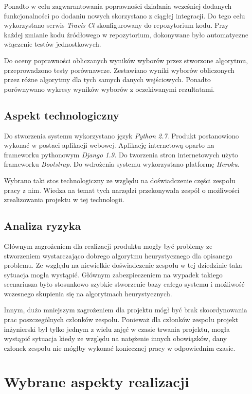 \documentclass[polish,11pt]{aghthesis}
\begin{document}
Ponadto w celu zagwarantowania poprawności działania wcześniej dodanych
funkcjonalności po dodaniu nowych skorzystano z ciągłej integracji. Do tego celu
wykorzystano serwis \textit{Travis Cl} skonfigurowany do repozytorium kodu. Przy każdej zmianie kodu źródłowego w repozytorium, dokonywane było automatyczne włączenie testów
jednostkowych.  

Do oceny poprawności obliczanych wyników wyborów przez stworzone algorytmu,
przeprowadzono testy porównawcze. Zestawiano wyniki wyborów obliczonych przez różne
algorytmy dla tych samych danych wejściowych. Ponadto porównywano wykresy wyników
wyborów z oczekiwanymi rezultatami.
\clearpage

\subsection{Aspekt technologiczny}
Do stworzenia systemu wykorzystano język \textit{Python 2.7}. Produkt postanowiono wykonać w
postaci aplikacji webowej. Aplikację internetową oparto na frameworku pythonowym \textit{Django 1.9.} Do tworzenia stron internetowych użyto frameworku \textit{Bootstrap}. Do wdrożenia systemu wykorzystano platformę \textit{Heroku}.

Wybrano taki stos technologiczny ze względu na doświadczenie części zespołu pracy z nim.
Wiedza na temat tych narzędzi przekonywała zespół o możliwości zrealizowania projektu w
tej technologii.

\subsection{Analiza ryzyka}
Głównym zagrożeniem dla realizacji produktu mogły być problemy ze stworzeniem
wystarczająco dobrego algorytmu heurystycznego dla opisanego problemu. Ze względu na
niewielkie doświadczenie zespołu w tej dziedzinie taka sytuacja mogła wystąpić. Głównym
zabezpieczeniem na wypadek takiego scenariusza było stosunkowo szybkie stworzenie
bazy całego systemu i możliwość wczesnego skupienia się na algorytmach heurystycznych.

Innym, dużo mniejszym zagrożeniem dla projektu mógł być brak skoordynowania prac
poszczególnych członków zespołu. Ponieważ dla członków zespołu projekt inżynierski był
tylko jednym z wielu zajęć w czasie trwania projektu, mogła wystąpić sytuacja kiedy ze
względu na natężenie innych obowiązków, dany członek zespołu nie mógłby wykonać
koniecznej pracy w odpowiednim czasie.

\section{Wybrane aspekty realizacji}
\end{document}
